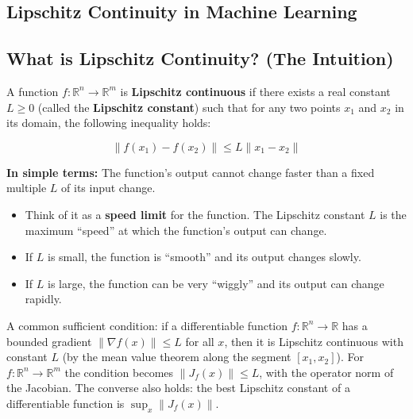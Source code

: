 \begin{notechapter}
\chapter{Lipschitz Continuity in Machine Learning}\label{ch:lipschitz-continuity}

\begin{abstract}
Lipschitz continuity is a fundamental mathematical concept that provides rigorous, quantifiable guarantees of stability, robustness, and convergence in machine learning models. This document explains the intuition behind Lipschitz continuity and details its critical applications in areas such as adversarial robustness, training optimization, generalization, and reinforcement learning.
\end{abstract}

\section{What is Lipschitz Continuity? (The Intuition)}

A function \( f: \mathbb{R}^n \to \mathbb{R}^m \) is \textbf{Lipschitz continuous} if there exists a real constant \( L \geq 0 \) (called the \textbf{Lipschitz constant}) such that for any two points \( x_1 \) and \( x_2 \) in its domain, the following inequality holds:

\begin{equation} \label{lipschitz-continuity:eq:lipschitz}
\|f(x_1) - f(x_2)\| \leq L \|x_1 - x_2\|
\end{equation}

\textbf{In simple terms:} The function's output cannot change faster than a fixed multiple \( L \) of its input change.

\begin{itemize}
    \item Think of it as a \textbf{speed limit} for the function. The Lipschitz constant \( L \) is the maximum ``speed'' at which the function's output can change.
    \item If \( L \) is small, the function is ``smooth'' and its output changes slowly.
    \item If \( L \) is large, the function can be very ``wiggly'' and its output can change rapidly.
\end{itemize}

A common sufficient condition: if a differentiable function \( f:\mathbb{R}^n\to\mathbb{R} \) has a bounded gradient \( \|\nabla f(x)\| \leq L \) for all \( x \), then it is Lipschitz continuous with constant \( L \) (by the mean value theorem along the segment \( [x_1, x_2] \)). For \( f:\mathbb{R}^n\to\mathbb{R}^m \) the condition becomes \( \|J_f(x)\| \leq L \), with the operator norm of the Jacobian. The converse also holds: the best Lipschitz constant of a differentiable function is \( \sup_x \|J_f(x)\| \).


\end{notechapter}
